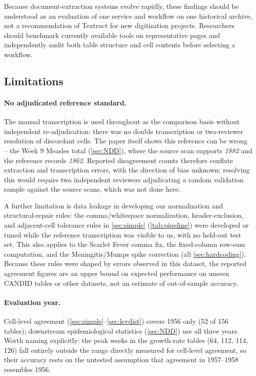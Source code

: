 \documentclass[12pt]{article}
\begin{document}
Because document-extraction systems evolve rapidly, these findings should be understood as an evaluation of one service and workflow on one historical archive, not a recommendation of Textract for new digitisation projects. Researchers should benchmark currently available tools on representative pages and independently audit both table structure and cell contents before selecting a workflow.



\subsection{Limitations}\label{sec:limitations}

\paragraph{No adjudicated reference standard.} The manual transcription is used throughout as the comparison basis without independent re-adjudication: there was no double transcription or two-reviewer resolution of discordant cells. The paper itself shows this reference can be wrong -- the Week 9 Measles total (\cref{sec:NDD}), where the source scan supports \textit{1882} and the reference records \textit{1862}. Reported disagreement counts therefore conflate extraction and transcription errors, with the direction of bias unknown; resolving this would require two independent reviewers adjudicating a random validation sample against the source scans, which was not done here.

A further limitation is data leakage in developing our normalization and structural-repair rules: the comma/whitespace normalization, header-exclusion, and adjacent-cell tolerance rules in \cref{sec:simple} (\cref{tab:pipeline}) were developed or tuned while the reference transcription was visible to us, with no held-out test set. This also applies to the Scarlet Fever comma fix, the fixed-column row-sum computation, and the Meningitis/Mumps spike correction (all \cref{sec:hardcoding}). Because these rules were shaped by errors observed in this dataset, the reported agreement figures are an upper bound on expected performance on unseen CANDID tables or other datasets, not an estimate of out-of-sample accuracy.

\paragraph{Evaluation year.} Cell-level agreement (\cref{sec:simple}--\cref{sec:levdist}) covers 1956 only (52 of 156 tables); downstream epidemiological statistics (\cref{sec:NDD}) use all three years. Worth naming explicitly: the peak weeks in the growth-rate tables (64, 112, 114, 126) fall entirely outside the range directly measured for cell-level agreement, so their accuracy rests on the untested assumption that agreement in 1957--1958 resembles 1956.
\end{document}
